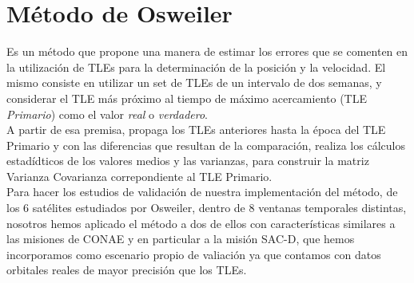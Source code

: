 


 


\section{M\'etodo de Osweiler}
Es un m\'etodo que propone una manera de estimar los errores que se comenten en la utilizaci\'on de TLEs para la determinaci\'on de la posici\'on y la velocidad.
 El mismo consiste en utilizar un set de TLEs de un intervalo de dos semanas, y considerar el TLE m\'as pr\'oximo al tiempo de m\'aximo acercamiento (TLE  {\it{Primario}}) como el valor {\it{real}} o {\it{verdadero}}.\\
 A partir de esa premisa, propaga los TLEs anteriores hasta la \'epoca del TLE Primario y con las diferencias que resultan de la comparaci\'on, realiza los c\'alculos estad\'idticos de los valores medios y las varianzas, para construir la matriz Varianza Covarianza correpondiente al TLE Primario.\\
 Para hacer los estudios de validaci\'on de nuestra implementaci\'on del m\'etodo, de los 6 sat\'elites estudiados por Osweiler, dentro de 8 ventanas temporales distintas, nosotros hemos aplicado el m\'etodo a dos de ellos con caracter\'isticas similares a las misiones de CONAE y en particular a la misi\'on SAC-D, que hemos incorporamos como escenario propio de valiaci\'on ya que contamos con datos orbitales reales de mayor precisi\'on que los TLEs.

